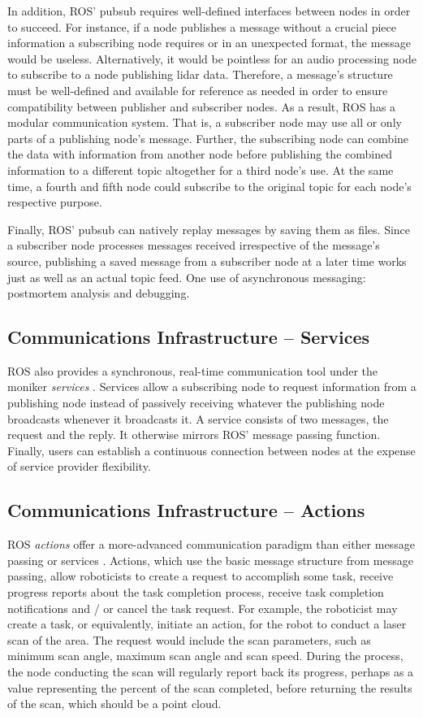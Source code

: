 \documentclass[9pt,twocolumn,twoside]{../../styles/osajnl}
\begin{document}
In addition, ROS' pubsub requires well-defined interfaces between nodes in order to succeed.  For instance, if a node publishes a message without a crucial piece information a subscribing node requires or in an unexpected format, the message would be useless.  Alternatively, it would be pointless for an audio processing node to subscribe to a node publishing lidar data.  Therefore, a message's structure must be well-defined and available for reference as needed in order to ensure compatibility between publisher and subscriber nodes.  As a result, ROS has a modular communication system.  That is, a subscriber node may use all or only parts of a publishing node's message.  Further, the subscribing node can combine the data with information from another node before publishing the combined information to a different topic altogether for a third node's use.  At the same time, a fourth and fifth node could subscribe to the original topic for each node's respective purpose.  

Finally, ROS' pubsub can natively replay messages by saving them as files.  Since a subscriber node processes messages received irrespective of the message's source, publishing a saved message from a subscriber node at a later time works just as well as an actual topic feed.  One use of asynchronous messaging: postmortem analysis and debugging.

\subsection{Communications Infrastructure -- Services}
ROS also provides a synchronous, real-time communication tool under the moniker \textit{services} \cite{www-ros-services}. Services allow a subscribing node to request information from a publishing node instead of passively receiving whatever the publishing node broadcasts whenever it broadcasts it.  A service consists of two messages, the request and the reply.  It otherwise mirrors ROS' message passing function.  Finally, users can establish a continuous connection between nodes at the expense of service provider flexibility.

\subsection{Communications Infrastructure -- Actions}
ROS \textit{actions} offer a more-advanced communication paradigm than either message passing or services \cite{www-ros-actionlib}.  Actions, which use the basic message structure from message passing, allow roboticists to create a request to accomplish some task, receive progress reports about the task completion process, receive task completion notifications and / or cancel the task request.  For example, the roboticist may create a task, or equivalently, initiate an action, for the robot to conduct a laser scan of the area.  The request would include the scan parameters, such as minimum scan angle, maximum scan angle and scan speed.  During the process, the node conducting the scan will regularly report back its progress, perhaps as a value representing the percent of the scan completed, before returning the results of the scan, which should be a point cloud.
\end{document}
